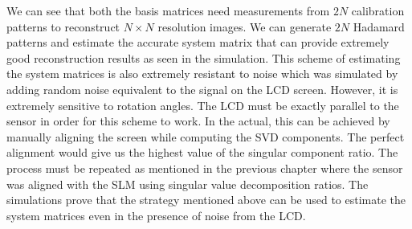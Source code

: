 We can see that both the basis matrices need measurements from $2N$ calibration patterns to reconstruct  $N \times N$ resolution images. We can generate $2N$ Hadamard patterns and estimate the accurate system matrix that can provide extremely good reconstruction results as seen in the simulation. This scheme of estimating the system matrices is also extremely resistant to noise which was simulated by adding random noise equivalent to the signal on the LCD screen. However, it is extremely sensitive to rotation angles. The LCD must be exactly parallel to the sensor in order for this scheme to work. In the actual, this can be achieved by manually aligning the screen while computing the SVD components. The perfect alignment would give us the highest value of the singular component ratio. The process must be repeated as mentioned in the previous chapter where the sensor was aligned with the SLM using singular value decomposition ratios. The simulations prove that the strategy mentioned above can be used to estimate the system matrices even in the presence of noise from the LCD.